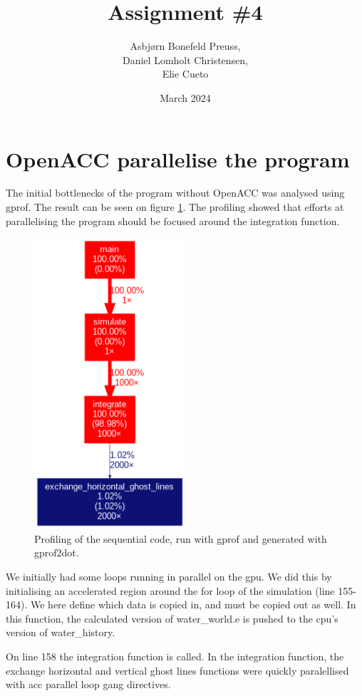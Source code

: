 \documentclass{article}
\title{Assignment \#4}
\author{Asbjørn Bonefeld Preuss,\\ Daniel Lomholt Christensen,\\ Elie Cueto}
\date{March 2024}
\begin{document}
\maketitle
\section{OpenACC parallelise the program}
The initial bottlenecks of the program without OpenACC was analysed using gprof. The result can be seen on figure \ref{fig:profiling:seq}. The profiling showed that efforts at parallelising the program should be focused around the integration function.
\begin{figure}[h]
    \includegraphics[width=0.5\textwidth]{./figures/sequential_profile.png}
    \centering
    \caption{Profiling of the sequential code, run with gprof and generated with gprof2dot.}
    \label{fig:profiling:seq}
\end{figure}
We initially had some loops running in parallel on the gpu. 
We did this by initialising an accelerated region around the for loop of the simulation (line 155-164).
We here define which data is copied in, and must be copied out as well. In this function, the calculated version of water\_world.e is pushed to the cpu's version of water\_history.

On line 158 the integration function is called. In the integration function, the exchange horizontal and vertical ghost lines functions were quickly paralellised with acc parallel loop gang directives.
\end{document}
